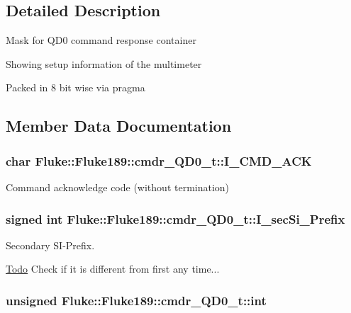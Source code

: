 \subsection{Detailed Description}
Mask for QD0 command response container\par
 Showing setup information of the multimeter\par
 Packed in 8 bit wise via pragma\par
 

\subsection{Member Data Documentation}
\hypertarget{structFluke_1_1Fluke189_1_1cmdr__QD0__t_ab46dd039cec29950bccb5090537d6272}{
\subsubsection[{I\_\-CMD\_\-ACK}]{\setlength{\rightskip}{0pt plus 5cm}char {\bf Fluke::Fluke189::cmdr\_\-QD0\_\-t::I\_\-CMD\_\-ACK}}}
\label{structFluke_1_1Fluke189_1_1cmdr__QD0__t_ab46dd039cec29950bccb5090537d6272}
Command acknowledge code (without termination) \hypertarget{structFluke_1_1Fluke189_1_1cmdr__QD0__t_a3bc502dcc711f5c308028b588e57e226}{
\subsubsection[{I\_\-secSi\_\-Prefix}]{\setlength{\rightskip}{0pt plus 5cm}signed {\bf int} {\bf Fluke::Fluke189::cmdr\_\-QD0\_\-t::I\_\-secSi\_\-Prefix}}}
\label{structFluke_1_1Fluke189_1_1cmdr__QD0__t_a3bc502dcc711f5c308028b588e57e226}


Secondary SI-\/Prefix. \begin{Desc}
\item[\hyperlink{todo__todo000014}{Todo}]Check if it is different from first any time... \end{Desc}
\hypertarget{structFluke_1_1Fluke189_1_1cmdr__QD0__t_a6ab6a1621f14f0fe83e89daadd9ba787}{
\subsubsection[{int}]{\setlength{\rightskip}{0pt plus 5cm}unsigned {\bf Fluke::Fluke189::cmdr\_\-QD0\_\-t::int}}}
\label{structFluke_1_1Fluke189_1_1cmdr__QD0__t_a6ab6a1621f14f0fe83e89daadd9ba787}


